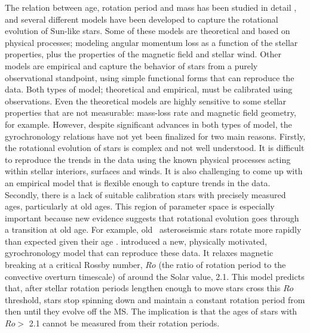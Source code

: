 
The relation between age, rotation period and mass has been studied in detail
, and several different models have been developed to
capture the rotational evolution of Sun-like stars.
Some of these models are theoretical and based on physical processes;
modeling angular momentum loss as a function of the stellar properties, plus
the properties of the magnetic field and stellar wind.
Other models are empirical and capture the behavior of stars from a purely
observational standpoint, using simple functional forms that can reproduce the
data.
Both types of model; theoretical and empirical, must be calibrated using
observations.
Even the theoretical models are highly sensitive to some stellar properties
that are not measurable: mass-loss rate and magnetic field geometry, for
example.
However, despite significant advances in both types of model,
the gyrochronology relations have not yet been finalized for two main reasons.
Firstly, the rotational evolution of stars is complex and not well understood.
It is difficult to reproduce the trends in the data using the known physical
processes acting within stellar interiors, surfaces and winds.
It is also challenging to come up with an empirical model that is flexible
enough to capture trends in the data.
Secondly, there is a lack of suitable calibration stars with precisely
measured ages, particularly at old ages.  %
This region of parameter space is especially important because new evidence
suggests that rotational evolution goes through a transition at old age.
For example, old \kepler\ asteroseismic stars rotate more rapidly than
expected given their age \citep[\eg][]{Angus2015, vansaders2016}.
\citet{vansaders2016} introduced a new, physically motivated, gyrochronology
model that can reproduce these data.
It relaxes magnetic breaking at a critical Rossby number, $Ro$ (the ratio of
rotation period to the convective overturn timescale) of around the Solar
value, 2.1.
This model predicts that, after stellar rotation periods lengthen enough to
move stars cross this $Ro$ threshold, stars stop spinning down and maintain a
constant rotation period from then until they evolve off the MS.
The implication is that the ages of stars with $Ro >$ 2.1 cannot be measured
from their rotation periods.

